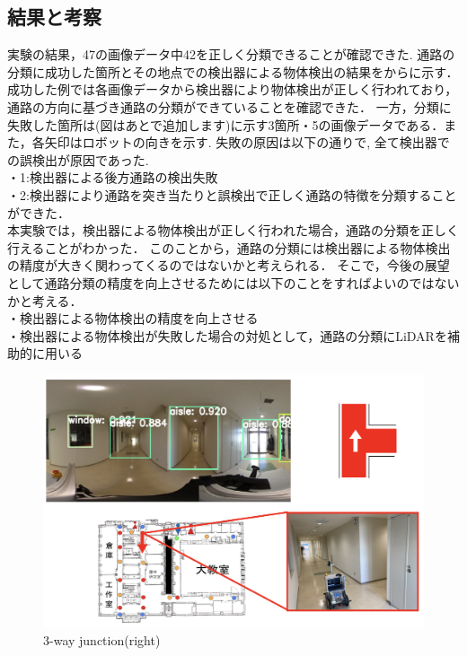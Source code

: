 \documentclass[../main]{subfiles}
\begin{document}
        \newpage

        \subsection{結果と考察}
        実験の結果，47の画像データ中42を正しく分類できることが確認できた.
        通路の分類に成功した箇所とその地点での検出器による物体検出の結果をからに示す．
        成功した例では各画像データから検出器により物体検出が正しく行われており，通路の方向に基づき通路の分類ができていることを確認できた．
        一方，分類に失敗した箇所は(図はあとで追加します)に示す3箇所・5の画像データである．また，各矢印はロボットの向きを示す.
        失敗の原因は以下の通りで, 全て検出器での誤検出が原因であった. \\
        ・1:検出器による後方通路の検出失敗\\
        ・2:検出器により通路を突き当たりと誤検出で正しく通路の特徴を分類することができた．\\

        本実験では，検出器による物体検出が正しく行われた場合，通路の分類を正しく行えることがわかった．
        このことから，通路の分類には検出器による物体検出の精度が大きく関わってくるのではないかと考えられる．
        そこで，今後の展望として通路分類の精度を向上させるためには以下のことをすればよいのではないかと考える．\\
        ・検出器による物体検出の精度を向上させる\\
        ・検出器による物体検出が失敗した場合の対処として，通路の分類にLiDARを補助的に用いる

        \begin{figure}[H]
            \centering
            \includegraphics[scale=0.5]{../images/experiment_3way_right.png}
            \caption{3-way junction(right)}
            \label{figure::3way_junction_right}
        \end{figure}
        
\end{document}
